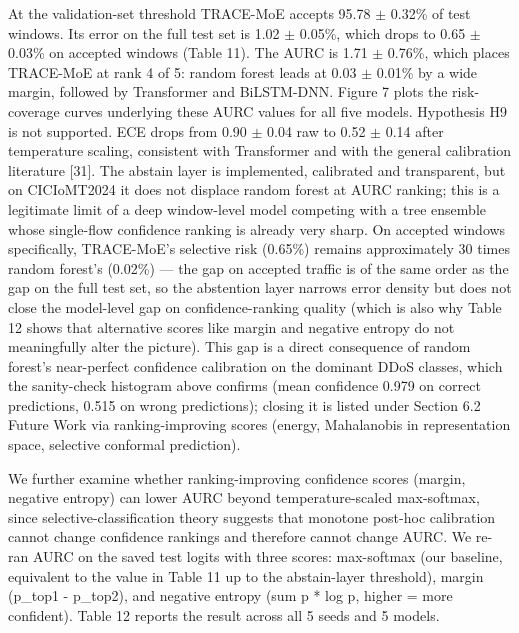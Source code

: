 \documentclass[11pt]{article}
\begin{document}
At the validation-set threshold TRACE-MoE accepts 95.78 $\pm$ 0.32\% of test windows. Its error on the full test set is 1.02 $\pm$ 0.05\%, which drops to 0.65 $\pm$ 0.03\% on accepted windows (Table 11). The AURC is 1.71 $\pm$ 0.76\%, which places TRACE-MoE at rank 4 of 5: random forest leads at 0.03 $\pm$ 0.01\% by a wide margin, followed by Transformer and BiLSTM-DNN. Figure 7 plots the risk-coverage curves underlying these AURC values for all five models. Hypothesis H9 is not supported. ECE drops from 0.90 $\pm$ 0.04 raw to 0.52 $\pm$ 0.14 after temperature scaling, consistent with Transformer and with the general calibration literature [31]. The abstain layer is implemented, calibrated and transparent, but on CICIoMT2024 it does not displace random forest at AURC ranking; this is a legitimate limit of a deep window-level model competing with a tree ensemble whose single-flow confidence ranking is already very sharp. On accepted windows specifically, TRACE-MoE's selective risk (0.65\%) remains approximately 30 times random forest's (0.02\%) --- the gap on accepted traffic is of the same order as the gap on the full test set, so the abstention layer narrows error density but does not close the model-level gap on confidence-ranking quality (which is also why Table 12 shows that alternative scores like margin and negative entropy do not meaningfully alter the picture). This gap is a direct consequence of random forest's near-perfect confidence calibration on the dominant DDoS classes, which the sanity-check histogram above confirms (mean confidence 0.979 on correct predictions, 0.515 on wrong predictions); closing it is listed under Section 6.2 Future Work via ranking-improving scores (energy, Mahalanobis in representation space, selective conformal prediction).

We further examine whether ranking-improving confidence scores (margin, negative entropy) can lower AURC beyond temperature-scaled max-softmax, since selective-classification theory suggests that monotone post-hoc calibration cannot change confidence rankings and therefore cannot change AURC. We re-ran AURC on the saved test logits with three scores: max-softmax (our baseline, equivalent to the value in Table 11 up to the abstain-layer threshold), margin (p\_top1 - p\_top2), and negative entropy (sum p * log p, higher = more confident). Table 12 reports the result across all 5 seeds and 5 models.

\begin{table}[htbp]
\centering
\caption{Alternative confidence scores for AURC on the official split, mean +/- std over 5 seeds.}
\label{tab:12}
\end{table}
\end{document}
